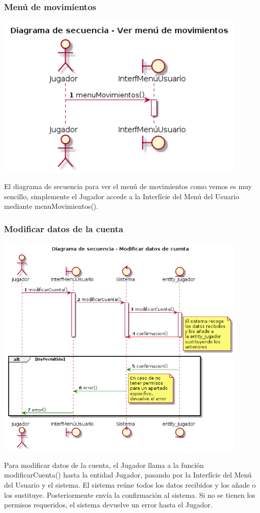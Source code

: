 \subsubsection{Menú de movimientos}
\begin{center}
  \includegraphics[width=0.9\textwidth]{./imatges/jugador/Menu_de_movimientos.png}
  \end{center}
  El diagrama de secuencia para ver el menú de movimientos como vemos es muy sencillo, simplemente el Jugador accede a la Interfície del Menú del Usuario mediante menuMovimientos().

\subsubsection{Modificar datos de la cuenta}
\begin{center}
  \includegraphics[width=0.9\textwidth]{./imatges/jugador/Modificar_datos_de_cuenta.png}
  \end{center}
  Para modificar datos de la cuenta, el Jugador llama a la función modificarCuenta() hasta la entidad Jugador, pasando por la Interfície del Menú del Usuario y el sistema. El sistema reúne todos los datos recibidos y los añade o los sustituye. Posteriormente envía la confirmación al sistema. Si no se tienen los permisos requeridos, el sistema devuelve un error hasta el Jugador.

